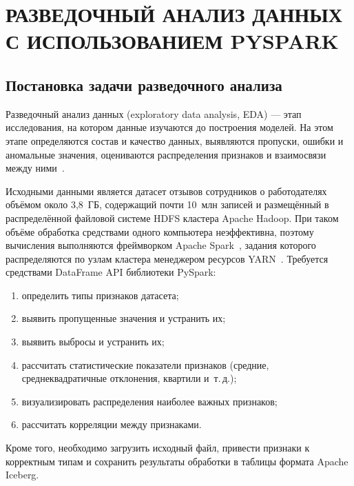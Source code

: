 %
\AtNextBibliography{\sloppy}

\chapter{\MakeUppercase{Разведочный анализ данных с использованием PySpark}}\label{ch:first}
\section{Постановка задачи разведочного анализа}\vspace{\baselineskip}

Разведочный анализ данных (exploratory data analysis, EDA) --- этап исследования, на котором данные изучаются до построения моделей. На этом этапе определяются состав и качество данных, выявляются пропуски, ошибки и аномальные значения, оцениваются распределения признаков и взаимосвязи между ними~\cite{tukey1977eda}.

Исходными данными является датасет отзывов сотрудников о работодателях объёмом около 3,8~ГБ, содержащий почти 10~млн записей и размещённый в распределённой файловой системе HDFS кластера Apache Hadoop. При таком объёме обработка средствами одного компьютера неэффективна, поэтому вычисления выполняются фреймворком Apache Spark~\cite{karau2015spark, spark2022official}, задания которого распределяются по узлам кластера менеджером ресурсов YARN~\cite{white2013hadoop}. Требуется средствами DataFrame API библиотеки PySpark:
\begin{enumerate}
    \item определить типы признаков датасета;
    \item выявить пропущенные значения и устранить их;
    \item выявить выбросы и устранить их;
    \item рассчитать статистические показатели признаков (средние, среднеквадратичные отклонения, квартили и~т.\,д.);
    \item визуализировать распределения наиболее важных признаков;
    \item рассчитать корреляции между признаками.
\end{enumerate}

Кроме того, необходимо загрузить исходный файл, привести признаки к корректным типам и сохранить результаты обработки в таблицы формата Apache Iceberg.

